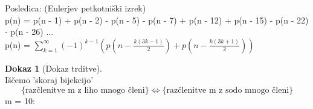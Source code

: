 \documentclass[a4paper,12pt]{article}
\theoremstyle{definition}
\newtheorem{pro}[counter]{Dokaz}
\theoremstyle{remark}
\newcommand{\Z}{\mathbb{Z}}
\begin{document}
Posledica: (Eulerjev petkotniški izrek)\\
p(n) = p(n - 1) + p(n - 2) - p(n - 5) - p(n - 7) + p(n - 12) + p(n - 15) - p(n - 22) - p(n - 26) ...\\
p(n) = $\displaystyle\sum_{k = 1}^{\infty} (-1)^{k - 1} (p(n - \frac{k (3k - 1)}{2}) + p(n - \frac{k (3k + 1)}{2}))$

\begin{pro}[Dokaz trditve]\mbox{}\\
Iščemo 'skoraj bijekcijo'\\
\[\{\text{razčlenitve m z liho mnogo členi}\} \iff \{\text{razčlenitve m z sodo mnogo členi}\}\]
m = 10:\\
\mbox{}\\



\end{pro}
\end{document}
